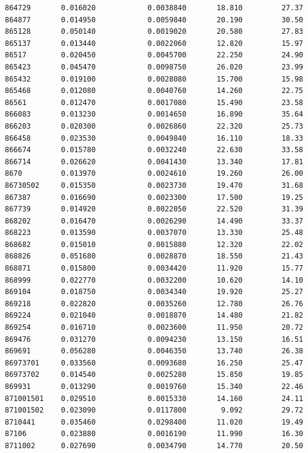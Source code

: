 \documentclass[
  letterpaper,
  DIV=11,
  numbers=noendperiod]{scrartcl}
\begin{document}
\begin{verbatim}
864729       0.016020            0.0038840       18.810         27.37
864877       0.014950            0.0059840       20.190         30.50
865128       0.050140            0.0019020       20.580         27.83
865137       0.013440            0.0022060       12.820         15.97
86517        0.020450            0.0045700       22.250         24.90
865423       0.045470            0.0098750       26.020         23.99
865432       0.019100            0.0028080       15.700         15.98
865468       0.012080            0.0040760       14.260         22.75
86561        0.012470            0.0017080       15.490         23.58
866083       0.013230            0.0014650       16.890         35.64
866203       0.020300            0.0026860       22.320         25.73
866458       0.023530            0.0049840       16.110         18.33
866674       0.015780            0.0032240       22.630         33.58
866714       0.026620            0.0041430       13.340         17.81
8670         0.013970            0.0024610       19.260         26.00
86730502     0.015350            0.0023730       19.470         31.68
867387       0.016690            0.0023300       17.500         19.25
867739       0.014920            0.0022050       22.520         31.39
868202       0.016470            0.0026290       14.490         33.37
868223       0.013590            0.0037070       13.330         25.48
868682       0.015010            0.0015880       12.320         22.02
868826       0.051680            0.0028870       18.550         21.43
868871       0.015800            0.0034420       11.920         15.77
868999       0.022770            0.0032200       10.620         14.10
869104       0.018750            0.0034340       19.920         25.27
869218       0.022820            0.0035260       12.780         26.76
869224       0.021040            0.0018870       14.480         21.82
869254       0.016710            0.0023600       11.950         20.72
869476       0.031270            0.0094230       13.150         16.51
869691       0.056280            0.0046350       13.740         26.38
86973701     0.033560            0.0093680       16.250         25.47
86973702     0.014540            0.0025280       15.850         19.85
869931       0.013290            0.0019760       15.340         22.46
871001501    0.029510            0.0015330       14.160         24.11
871001502    0.023090            0.0117800        9.092         29.72
8710441      0.035460            0.0298400       11.020         19.49
87106        0.023880            0.0016190       11.990         16.30
8711002      0.027690            0.0034790       14.770         20.50

\end{verbatim}
\end{document}
